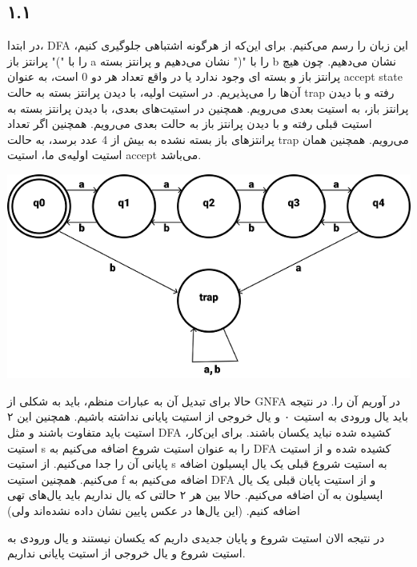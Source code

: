 \subsection*{۱.۱}

در ابتدا، DFA این زبان را رسم می‌کنیم. برای این‌که از هرگونه اشتباهی جلوگیری کنیم، پرانتز باز "(" را با a نشان می‌دهیم و پرانتز بسته ")" را با b نشان می‌دهیم. چون هیچ پرانتز باز و بسته ای وجود ندارد یا در واقع تعداد هر دو 0 است، به عنوان accept state آن‌ها را می‌پذیریم. در استیت اولیه، با دیدن پرانتز بسته به حالت trap رفته و با دیدن پرانتز باز، به استیت بعدی می‌رویم. همچنین در استیت‌های بعدی، با دیدن پرانتز بسته به استیت قبلی رفته و با دیدن پرانتز باز به حالت بعدی می‌رویم. همچنین اگر تعداد پرانتزهای باز بسته نشده به بیش از 4 عدد برسد، به حالت trap می‌رویم. همچنین همان استیت اولیه‌ی ما، استیت accept می‌باشد.

\begin{center}
	\includegraphics{DFA11}
\end{center}

حالا برای تبدیل آن به عبارات منظم، باید به شکلی از GNFA در آوریم آن را. در نتیجه باید یال ورودی به استیت ۰ و یال خروجی از استیت پایانی نداشته باشیم. همچنین این ۲ استیت باید متفاوت باشند و مثل DFA کشیده شده نباید یکسان باشند. برای این‌کار، استیت s را به عنوان استیت شروع اضافه می‌کنیم به DFA کشیده شده و از استیت پایانی آن را جدا می‌کنیم. از استیت s به استیت شروع قبلی یک یال اپسیلون اضافه می‌کنیم. همچنین استیت f اضافه می‌کنیم به DFA و از استیت پایان قبلی یک یال اپسیلون به آن اضافه می‌کنیم. حالا بین هر ۲ حالتی که یال نداریم باید یال‌های تهی اضافه کنیم. (این یال‌ها در عکس پایین نشان داده نشده‌اند ولی) 


در نتیجه الان استیت شروع و پایان جدیدی داریم که یکسان نیستند و یال ورودی به استیت شروع و یال خروجی از استیت پایانی نداریم.

